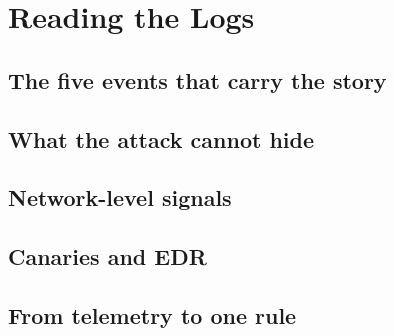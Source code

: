 \section{Reading the Logs}
\unwritten
\label{sec:detection}

\subsection{The five events that carry the story}
\unwritten

\subsection{What the attack cannot hide}
\unwritten

\subsection{Network-level signals}
\unwritten

\subsection{Canaries and EDR}
\unwritten

\subsection{From telemetry to one rule}
\unwritten
